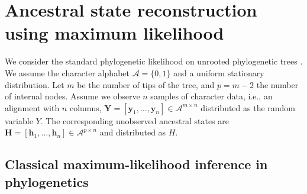 \documentclass{article}
\newcommand{\alphabet}{\mathcal{A}}
\newcommand{\fullAlignment}{\mathbf{Y}}
\newcommand{\alignmentColumn}{\mathbf{y}}
\newcommand{\alignmentColumnRV}{Y}
\newcommand{\fullAncestralStates}{\mathbf{H}}
\newcommand{\ancestralStateColumn}{\mathbf{h}}
\newcommand{\ancestralStateColumnRV}{H}
\newcommand{\nCols}{n}
\newcommand{\nSiteRows}{m}
\newcommand{\nAncestralStateRows}{p}
\begin{document}
%


\section{Ancestral state reconstruction using maximum likelihood}

We consider the standard phylogenetic likelihood on unrooted phylogenetic trees \cite{Felsenstein2004}.
We assume the character alphabet $\alphabet=\{0,1\}$ and a uniform stationary distribution.
Let $\nSiteRows$ be the number of tips of the tree, and $\nAncestralStateRows = \nSiteRows-2$ the number of internal nodes.
Assume we observe $\nCols$ samples of character data, i.e., an alignment with $\nCols$ columns, $\fullAlignment=[\alignmentColumn_1,\ldots,\alignmentColumn_\nCols]\in\alphabet^{\nSiteRows\times\nCols}$ distributed as the random variable $\alignmentColumnRV$.
The corresponding unobserved ancestral states are $\fullAncestralStates=[\ancestralStateColumn_1,\ldots,\ancestralStateColumn_\nCols]\in\alphabet^{\nAncestralStateRows\times\nCols}$ and distributed as $\ancestralStateColumnRV$.

\subsection{Classical maximum-likelihood inference in phylogenetics}
\end{document}
